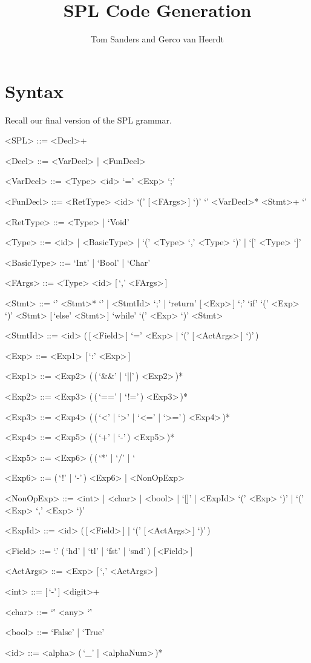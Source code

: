 \documentclass[a4paper]{article}
\title{SPL Code Generation}
\author{Tom Sanders and Gerco van Heerdt}
\begin{document}
\maketitle

\section{Syntax}

Recall our final version of the SPL grammar.
\setlength{\grammarindent}{7.1em}
\begin{grammar}
    <SPL> ::= <Decl>+

    <Decl> ::= <VarDecl> | <FunDecl>

    <VarDecl> ::= <Type> <id> `=' <Exp> `;'

    <FunDecl> ::= <RetType> <id> `(' [\,<FArgs>\,] `)' `{' <VarDecl>* <Stmt>+ `}'

    <RetType> ::= <Type> | `Void'

    <Type> ::= <id> | <BasicType> | `(' <Type> `,' <Type> `)' | `[' <Type> `]'

    <BasicType> ::= `Int' | `Bool' | `Char'

    <FArgs> ::= <Type> <id> [\,`,' <FArgs>\,]

    <Stmt> ::= `{' <Stmt>* `}' | <StmtId> `;' | `return' [\,<Exp>\,] `;'
    \alt `if' `(' <Exp> `)' <Stmt> [\,`else' <Stmt>\,]
    \alt `while' `(' <Exp> `)' <Stmt>

    <StmtId> ::= <id> (\,[\,<Field>\,] `=' <Exp> | `(' [\,<ActArgs>\,] `)'\,)

    <Exp> ::= <Exp1> [\,`:' <Exp>\,]

    <Exp1> ::= <Exp2> (\,(\,`&&' | `||'\,) <Exp2>\,)*

    <Exp2> ::= <Exp3> (\,(\,`==' | `!='\,) <Exp3>\,)*

    <Exp3> ::= <Exp4> (\,(\,`<' | `>' | `<=' | `>='\,) <Exp4>\,)*

    <Exp4> ::= <Exp5> (\,(\,`+' | `-'\,) <Exp5>\,)*

    <Exp5> ::= <Exp6> (\,(\,`*' | `/' | `%

    <Exp6> ::= (\,`!' | `-'\,) <Exp6> | <NonOpExp>

    <NonOpExp> ::= <int> | <char> | <bool> | `[]' | <ExpId>
    \alt `(' <Exp> `)' | `(' <Exp> `,' <Exp> `)'

    <ExpId> ::= <id> (\,[\,<Field>\,] | `(' [\,<ActArgs>\,] `)'\,)

    <Field> ::= `.' (\,`hd' | `tl' | `fst' | `snd'\,) [\,<Field>\,]

    <ActArgs> ::= <Exp> [\,`,' <ActArgs>\,]

    <int> ::= [\,`-'\,] <digit>+

    <char> ::= `\'' <any> `\''

    <bool> ::= `False' | `True'

    <id> ::= <alpha> (\,`_' | <alphaNum>\,)*
\end{grammar}
\end{document}
